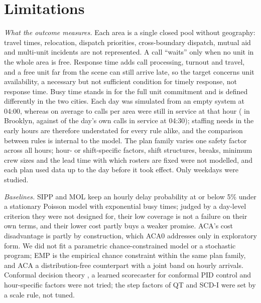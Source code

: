 \documentclass[11pt]{article}
\begin{document}
\section{Limitations}

\emph{What the outcome measures.} Each area is a single closed pool without geography: travel times, relocation, dispatch priorities, cross-boundary dispatch, mutual aid and multi-unit incidents are not represented. A call ``waits'' only when no unit in the whole area is free. Response time adds call processing, turnout and travel, and a free unit far from the scene can still arrive late, so the target concerns unit availability, a necessary but not sufficient condition for timely response, not response time. Busy time stands in for the full unit commitment and is defined differently in the two cities. Each day was simulated from an empty system at 04:00, whereas on average  to  calls per area were still in service at that hour ( in Brooklyn, against  of the day's own calls in service at 04:30); staffing needs in the early hours are therefore understated for every rule alike, and the comparison between rules is internal to the model. The plan family varies one safety factor across all hours; hour- or shift-specific factors, shift structures, breaks, minimum crew sizes and the lead time with which rosters are fixed were not modelled, and each plan used data up to the day before it took effect. Only weekdays were studied.

\emph{Baselines.} SIPP and MOL keep an hourly delay probability at or below 5\% under a stationary Poisson model with exponential busy times; judged by a day-level criterion they were not designed for, their low coverage is not a failure on their own terms, and their lower cost partly buys a weaker promise. ACA's cost disadvantage is partly by construction, which ACA0 addresses only in exploratory form. We did not fit a parametric chance-constrained model \citep{gurvich2010staffing} or a stochastic program; EMP is the empirical chance constraint within the same plan family, and ACA a distribution-free counterpart with a joint band on hourly arrivals. Conformal decision theory \citep{lekeufack2024conformal}, a learned scorecaster for conformal PID control and hour-specific factors were not tried; the step factors of QT and SCD-I were set by a scale rule, not tuned.
\end{document}
